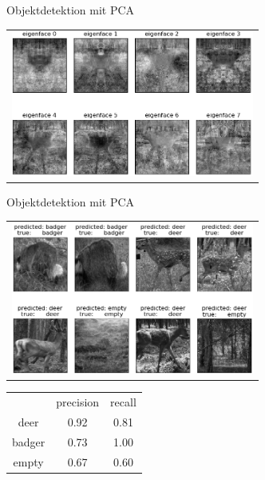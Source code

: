 \begin{frame}[t,fragile]{Objektdetektion mit PCA}
  \vspace{0.01em}
  {
\begin{table}
\centering
        \begin{tabular}{c}
        \includegraphics[width=8cm]{img/Segmentierung/pca_eigen}\\
         \end{tabular}
        
\end{table}
 }

\end{frame}

\begin{frame}[t,fragile]{Objektdetektion mit PCA}
  \vspace{0.01em}
  {
\begin{table}
\centering
        \begin{tabular}{c}
        \includegraphics[width=8cm]{img/Segmentierung/pca_test}\\
         \end{tabular}
        \begin{tabular}{ccc}
     				&precision    & recall   \\
		deer   &    0.92  &    0.81\\
		badger   &  0.73   &  1.00\\
		empty     &  0.67   &   0.60\\
         \end{tabular}
\end{table}
 }

\end{frame}

